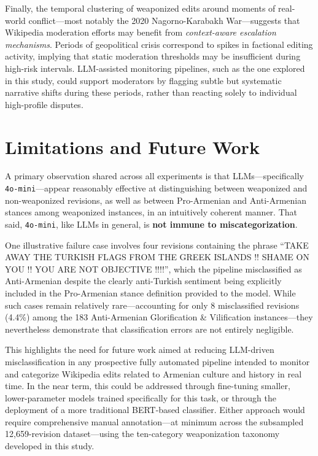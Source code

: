 \documentclass[11pt, a4paper, twoside, openright]{article} %
\begin{document}
Finally, the temporal clustering of weaponized edits around moments of real-world conflict—most notably the 2020 Nagorno-Karabakh War—suggests that Wikipedia moderation efforts may benefit from \emph{context-aware escalation mechanisms}. Periods of geopolitical crisis correspond to spikes in factional editing activity, implying that static moderation thresholds may be insufficient during high-risk intervals. LLM-assisted monitoring pipelines, such as the one explored in this study, could support moderators by flagging subtle but systematic narrative shifts during these periods, rather than reacting solely to individual high-profile disputes.


\section{Limitations and Future Work}

A primary observation shared across all experiments is that LLMs—specifically \texttt{4o-mini}—appear reasonably effective at distinguishing between weaponized and non-weaponized revisions, as well as between Pro-Armenian and Anti-Armenian stances among weaponized instances, in an intuitively coherent manner. That said, \texttt{4o-mini}, like LLMs in general, is \textbf{not immune to miscategorization}.

One illustrative failure case involves four revisions containing the phrase ``TAKE AWAY THE TURKISH FLAGS FROM THE GREEK ISLANDS !! SHAME ON YOU !! YOU ARE NOT OBJECTIVE !!!!'', which the pipeline misclassified as Anti-Armenian despite the clearly anti-Turkish sentiment being explicitly included in the Pro-Armenian stance definition provided to the model. While such cases remain relatively rare—accounting for only 8 misclassified revisions (4.4\%) among the 183 Anti-Armenian Glorification \& Vilification instances—they nevertheless demonstrate that classification errors are not entirely negligible.

This highlights the need for future work aimed at reducing LLM-driven misclassification in any prospective fully automated pipeline intended to monitor and categorize Wikipedia edits related to Armenian culture and history in real time. In the near term, this could be addressed through fine-tuning smaller, lower-parameter models trained specifically for this task, or through the deployment of a more traditional BERT-based classifier. Either approach would require comprehensive manual annotation—at minimum across the subsampled 12,659-revision dataset—using the ten-category weaponization taxonomy developed in this study.
\end{document}
